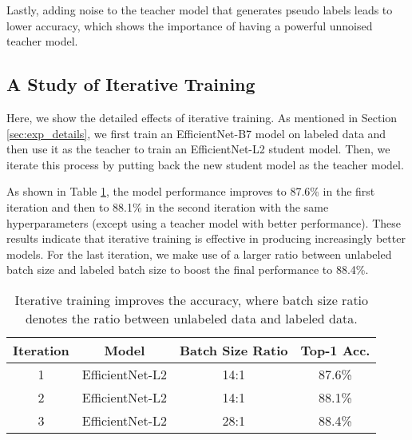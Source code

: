 \documentclass[10pt,twocolumn,letterpaper]{article}
\begin{document}
Lastly, adding noise to the teacher model that generates pseudo labels leads to lower accuracy, which shows the importance of having a powerful unnoised teacher model. 



\subsection{A Study of Iterative Training}
\label{sec:iterative_training}
Here, we show the detailed effects of iterative training. As mentioned in Section \ref{sec:exp_details}, we first train an EfficientNet-B7 model on labeled data and then use
it as the teacher to train an EfficientNet-L2 student model. Then, we iterate this process by putting back the new student model as the teacher model.

As shown in Table \ref{tab:iterative_training}, the model
performance improves to 87.6\% in the first iteration and then to 88.1\% in the second iteration with the same hyperparameters (except using a teacher model with better performance). These results indicate that iterative training is effective in producing increasingly better models. For the last iteration, we make use of a larger ratio between unlabeled batch size and labeled batch size to boost the final performance to 88.4\%.

\begin{table}[h!]
\small
    \centering                                                                 
        \begin{tabular}{ccc|c}                                     
        \toprule 
        Iteration & Model & Batch Size Ratio & Top-1 Acc. \\
        \midrule
        1 & EfficientNet-L2 & 14:1 & 87.6\% \\
        2 & EfficientNet-L2 & 14:1 & 88.1\% \\
        3 & EfficientNet-L2 & 28:1 & 88.4\% \\
        \bottomrule
        \end{tabular}
    \caption{Iterative training improves the accuracy, where batch size ratio denotes the ratio between unlabeled data and labeled data.} 
    \label{tab:iterative_training}
\end{table}
\end{document}
